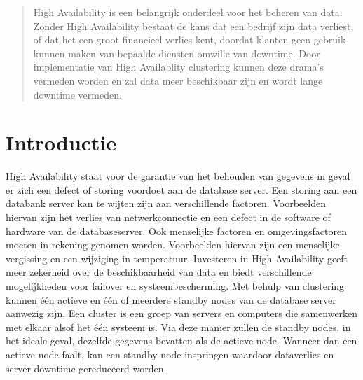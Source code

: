 \documentclass[a0,portrait]{a0poster}
\begin{document}
\begin{multicols}{2} %


\color{HoGentAccent1} %

\begin{abstract}
High Availability is een belangrijk onderdeel voor het beheren van data. Zonder High Availability bestaat de kans dat een bedrijf zijn data verliest, of dat het een groot financieel verlies kent, doordat klanten geen gebruik kunnen maken van bepaalde diensten omwille van downtime. Door implementatie van High Availablity clustering kunnen deze drama's vermeden worden en zal data meer beschikbaar zijn en wordt lange downtime vermeden.
\end{abstract}

\color{HoGentAccent1} 
\section*{Introductie}
\color{black}
\color{black}
High Availability staat voor de garantie van het behouden van gegevens in geval er zich een defect of storing voordoet aan de database server. Een storing aan een databank server kan te wijten zijn aan verschillende factoren. Voorbeelden hiervan zijn het verlies van netwerkconnectie en een defect in de software of hardware van de databaseserver. Ook menselijke factoren en omgevingsfactoren moeten in rekening genomen worden. Voorbeelden hiervan zijn een menselijke vergissing en een wijziging in temperatuur. Investeren in High Availability geeft meer zekerheid over de beschikbaarheid van data en biedt verschillende mogelijkheden voor failover en systeembescherming. 
Met behulp van clustering kunnen één actieve en één of meerdere standby nodes van de database server aanwezig zijn. Een cluster is een groep van servers en computers die samenwerken met elkaar alsof het één systeem is. Via deze manier zullen de standby nodes, in het ideale geval, dezelfde gegevens bevatten als de actieve node. Wanneer dan een actieve node faalt, kan een standby node inspringen waardoor dataverlies en server downtime gereduceerd worden.



\end{multicols}
\end{document}
